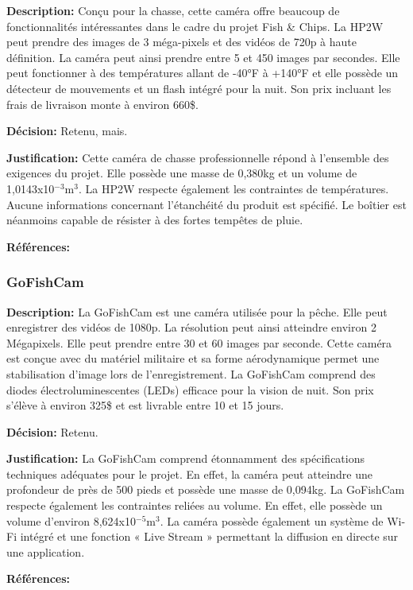 \textbf{Description:} Conçu pour la chasse, cette caméra offre beaucoup de fonctionnalités intéressantes dans le cadre du projet Fish \& Chips. La HP2W peut prendre des images de 3 méga-pixels et des vidéos de 720p à haute définition. La caméra peut ainsi prendre entre 5 et 450 images par secondes. Elle peut fonctionner à des températures allant de -40°F à +140°F et elle possède un détecteur de mouvements et un flash intégré pour la nuit. Son prix incluant les frais de livraison monte à environ 660\$.

\textbf{Décision:} Retenu, mais.

\textbf{Justification:} Cette caméra de chasse professionnelle répond à l'ensemble des exigences du projet. Elle possède une masse de 0,380kg et un volume de 1,0143x10$^{-3}$m$^3$. La HP2W respecte également les contraintes de températures. Aucune informations concernant l'étanchéité du produit est spécifié. Le boîtier est néanmoins capable de résister à des fortes tempêtes de pluie.

\textbf{Références:} \cite{HP2W}


\subsubsection{GoFishCam}

\textbf{Description:} La GoFishCam est une caméra utilisée pour la pêche. Elle peut enregistrer des vidéos de 1080p. La résolution peut ainsi atteindre environ 2 Mégapixels. Elle peut prendre entre 30 et 60 images par seconde. Cette caméra est conçue avec du matériel militaire et sa forme aérodynamique permet une stabilisation d'image lors de l'enregistrement. La GoFishCam comprend des diodes électroluminescentes (LEDs) efficace pour la vision de nuit. Son prix s'élève à environ 325\$ et est livrable entre 10 et 15 jours.

\textbf{Décision:} Retenu.

\textbf{Justification:} La GoFishCam comprend étonnamment des spécifications techniques adéquates pour le projet. En effet, la caméra peut atteindre une profondeur de près de 500 pieds et possède une masse de 0,094kg. La GoFishCam respecte également les contraintes reliées au volume. En effet, elle possède un volume d'environ 8,624x10$^{-5}$m$^3$. La caméra possède également un système de Wi-Fi intégré et une fonction « Live Stream » permettant la diffusion en directe sur une application.

\textbf{Références:} \cite{GoFishCam} \cite{GoFishCam_resolution}


